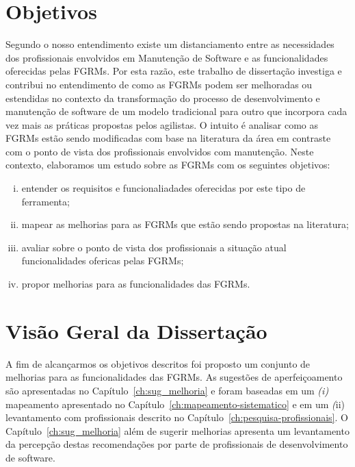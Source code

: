 \section{Objetivos}
\label{sec:intro-objetivos}

Segundo o nosso entendimento existe um distanciamento entre as necessidades dos
profissionais envolvidos em Manutenção de Software e as funcionalidades
oferecidas pelas FGRMs\@. Por esta razão, este trabalho de dissertação investiga
e contribui no entendimento de como as FGRMs podem ser melhoradas ou estendidas
no contexto da transformação do processo de desenvolvimento e manutenção de
software de um modelo tradicional para outro que incorpora cada vez mais as
práticas propostas pelos agilistas. O intuito é analisar como as FGRMs estão
sendo modificadas com base na literatura da área em contraste com o ponto de
vista dos profissionais envolvidos com manutenção. Neste contexto, elaboramos um
estudo sobre as FGRMs com os seguintes objetivos:

\begin{enumerate}[(i)]
	\item entender os requisitos e funcionaliadades oferecidas por este tipo de
        ferramenta;
	\item mapear as melhorias para as FGRMs que estão sendo propostas na
		literatura;
	\item avaliar sobre o ponto de vista dos profissionais a
		situação atual funcionalidades ofericas pelas FGRMs\@;
	\item propor melhorias para as funcionalidades das FGRMs\@.
\end{enumerate}


\section{Visão Geral da Dissertação}
\label{sec:intro-visao-geral}

A fim de alcançarmos os objetivos descritos foi proposto um conjunto de
melhorias para as funcionalidades das FGRMs. As sugestões de aperfeiçoamento são
apresentadas no Capítulo~\ref{ch:sug_melhoria} e foram baseadas em um
\textit{(i)} mapeamento apresentado no Capítulo~\ref{ch:mapeamento-sistematico}
e em um \textit(ii) levantamento com profissionais descrito no
Capítulo~\ref{ch:pesquisa-profissionais}. O Capítulo~\ref{ch:sug_melhoria} além
de sugerir melhorias apresenta um levantamento da percepção destas recomendações
por parte de profissionais de desenvolvimento de software.

